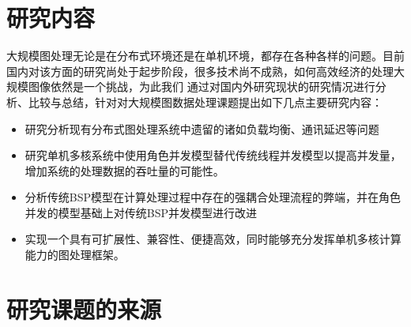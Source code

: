 \section{研究内容}
大规模图处理无论是在分布式环境还是在单机环境，都存在各种各样的问题。目前国内对该方面的研究尚处于起步阶段，很多技术尚不成熟，如何高效经济的处理大规模图像依然是一个挑战，为此我们
通过对国内外研究现状的研究情况进行分析、比较与总结，针对对大规模图数据处理课题提出如下几点主要研究内容：
\begin{itemize}
\item 研究分析现有分布式图处理系统中遗留的诸如负载均衡、通讯延迟等问题
\item 研究单机多核系统中使用角色并发模型替代传统线程并发模型以提高并发量，增加系统的处理数据的吞吐量的可能性。
\item 分析传统BSP模型在计算处理过程中存在的强耦合处理流程的弊端，并在角色并发的模型基础上对传统BSP并发模型进行改进
\item 实现一个具有可扩展性、兼容性、便捷高效，同时能够充分发挥单机多核计算能力的图处理框架。
\end{itemize}

\section{研究课题的来源}